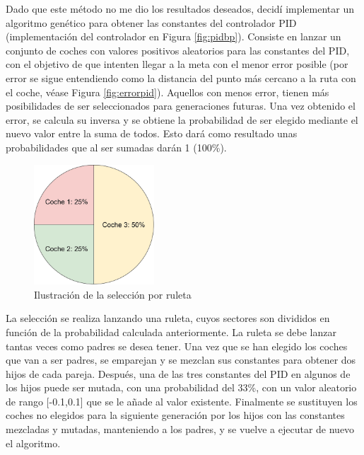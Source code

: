 \bigskip

Dado que este método no me dio los resultados deseados, decidí implementar un algoritmo genético para obtener las constantes del controlador PID (implementación del controlador en Figura \ref{fig:pidbp}). Consiste en lanzar un conjunto de coches con valores positivos aleatorios para las constantes del PID, con el objetivo de que intenten llegar a la meta con el menor error posible (por error se sigue entendiendo como la distancia del punto más cercano a la ruta con el coche, véase Figura \ref{fig:errorpid}). Aquellos con menos error, tienen más posibilidades de ser seleccionados para generaciones futuras. Una vez obtenido el error, se calcula su inversa y se obtiene la probabilidad de ser elegido mediante el nuevo valor entre la suma de todos. Esto dará como resultado unas probabilidades que al ser sumadas darán 1 (100\%). 

\bigskip
\begin{figure}[H]
    \centering
    \includegraphics[width=0.4\textwidth]{imagenes/converted/ruleta.jpg}
    \caption{Ilustración de la selección por ruleta}
    \label{fig:ruleta}
\end{figure}

La selección se realiza lanzando una ruleta\cite{gaperformance}, cuyos sectores son divididos en función de la probabilidad calculada anteriormente. La ruleta se debe lanzar tantas veces como padres se desea tener. Una vez que se han elegido los coches que van a ser padres, se emparejan y se mezclan sus constantes para obtener dos hijos de cada pareja. Después, una de las tres constantes del PID en algunos de los hijos puede ser mutada, con una probabilidad del 33\%, con un valor aleatorio de rango [-0.1,0.1] que se le añade al valor existente. Finalmente se sustituyen los coches no elegidos para la siguiente generación por los hijos con las constantes mezcladas y mutadas, manteniendo a los padres, y se vuelve a ejecutar de nuevo el algoritmo.

